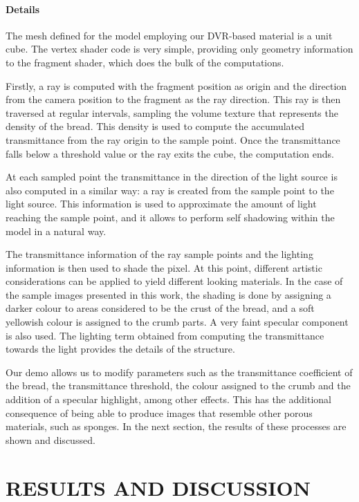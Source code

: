 \documentclass[oneside,a4paper,spanish,links]{amca}
\begin{document}
\paragraph{Details}

The mesh defined for the model employing our DVR-based material is a unit
cube. The vertex shader code is very simple, providing only geometry
information to the fragment shader, which does the bulk of the
computations. 

Firstly, a ray is computed with the fragment position as origin and
the direction from the camera position to the fragment as the ray
direction. This ray is then traversed at regular intervals, sampling
the volume texture that represents the density of the bread. This
density is used to compute the accumulated transmittance from the ray
origin to the sample point. Once the transmittance falls below a
threshold value or the ray exits the cube, the computation ends.

At each sampled point the transmittance in the direction of the light
source is also computed in a similar way: a ray is created from the
sample point to the light source. This information is used to
approximate the amount of light reaching the sample point, and it
allows to perform self shadowing within the model in a natural
way. 

The transmittance information of the ray sample points and the
lighting information is then used to shade the pixel. At this point,
different artistic considerations can be applied to yield different
looking materials. In the case of the sample images presented
in this work, the shading is done by assigning a darker colour to areas
considered to be the crust of the bread, and a soft yellowish colour is
assigned to the crumb parts. A very faint specular component is also
used. The lighting term obtained from computing the transmittance
towards the light provides the details of the structure.

Our demo allows us to modify parameters such as the
transmittance coefficient of the bread, the transmittance threshold,
the colour assigned to the crumb and the addition of a specular
highlight, among other effects. This has the additional consequence of
being able to produce images that resemble other porous materials,
such as sponges. In the next section, the results of these processes
are shown and discussed.

\section{RESULTS AND DISCUSSION}
\end{document}
